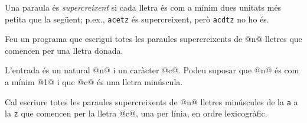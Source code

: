 

\Statement

Una paraula és
\emph{supercreixent} si cada lletra és com a mínim dues unitats més petita
que la següent; p.ex., \texttt{acetz} és supercreixent, però
\texttt{acdtz} no ho és.

\medskip

Feu un programa que escrigui totes les paraules supercreixents de @n@
lletres que comencen per una lletra donada.


\Input

L'entrada és un natural @n@ i un
caràcter @c@. Podeu suposar que
@n@ és com a mínim @1@ i que @c@ és una lletra minúscula.

\Output

Cal escriure totes les paraules supercreixents de @n@
lletres minúscules de la \texttt{a} a la \texttt{z} que comencen per
la lletra @c@, una per línia, en ordre lexicogràfic.

\SampleTwoCol
